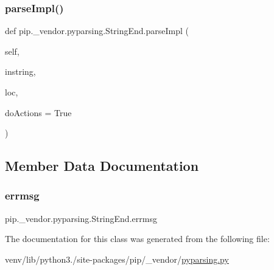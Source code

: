 \subsubsection{\texorpdfstring{parse\+Impl()}{parseImpl()}}
{\footnotesize\ttfamily def pip.\+\_\+vendor.\+pyparsing.\+String\+End.\+parse\+Impl (\begin{DoxyParamCaption}\item[{}]{self,  }\item[{}]{instring,  }\item[{}]{loc,  }\item[{}]{do\+Actions = {\ttfamily True} }\end{DoxyParamCaption})}



\subsection{Member Data Documentation}
\mbox{\label{classpip_1_1__vendor_1_1pyparsing_1_1StringEnd_a43adf228e9caca5ba34ef7c8a417605d}} 
\subsubsection{\texorpdfstring{errmsg}{errmsg}}
{\footnotesize\ttfamily pip.\+\_\+vendor.\+pyparsing.\+String\+End.\+errmsg}



The documentation for this class was generated from the following file\+:\begin{DoxyCompactItemize}
\item 
venv/lib/python3./site-\/packages/pip/\+\_\+vendor/\hyperlink{pip_2__vendor_2pyparsing_8py}{pyparsing.\+py}\end{DoxyCompactItemize}
